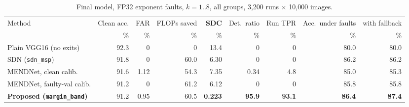 \documentclass[10pt,a4paper]{article}
\newcommand{\meth}[1]{\texttt{#1}}
\newcommand{\ours}{\meth{margin\_band}}
\begin{document}
\begin{table}[H]
\centering\small
\caption{Final model, FP32 exponent faults, $k=1..8$, all groups, 3{,}200 runs $\times$ 10{,}000 images.}
\begin{adjustbox}{max width=\linewidth}
\begin{tabular}{@{}lrrrrrrrr@{}}
\toprule
Method & Clean acc. & FAR & FLOPs saved & \textbf{SDC} & Det.\ ratio & Run TPR & Acc.\ under faults & with fallback \\
 & \% & \% & \% & \% & \% & \% & \% & \% \\
\midrule
Plain VGG16 (no exits)          & 92.3 & 0    & 0    & 13.4  & 0    & 0    & 80.0 & 80.0 \\
SDN (\meth{sdn\_msp})           & 91.8 & 0    & 60.0 & 6.30  & 0    & 0    & 86.2 & 86.2 \\
MENDNet, clean calib.           & 91.6 & 1.12 & 54.3 & 7.35  & 0.34 & 4.8  & 85.0 & 85.3 \\
MENDNet, faulty-val calib.      & 91.2 & 0    & 61.2 & 6.12  & 0    & 0    & 85.8 & 85.8 \\
\midrule
\textbf{Proposed (\ours)}       & 91.2 & 0.95 & 60.5 & \textbf{0.223} & \textbf{95.9} & \textbf{93.1} & \textbf{86.4} & \textbf{87.4} \\
\bottomrule
\end{tabular}
\end{adjustbox}
\end{table}
\end{document}
